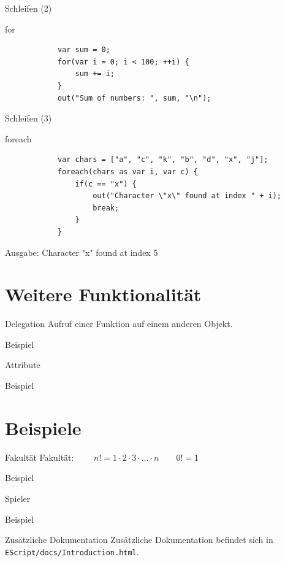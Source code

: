\documentclass[ucs,9pt]{beamer}
\begin{document}
\begin{frame}[fragile]{Schleifen (2)}
	\begin{block}{for}
		\begin{lstlisting}
			var sum = 0;
			for(var i = 0; i < 100; ++i) {
			    sum += i;
			}
			out("Sum of numbers: ", sum, "\n");
		\end{lstlisting}
	\end{block}
\end{frame}

\begin{frame}[fragile]{Schleifen (3)}
	\begin{block}{foreach}
		\begin{lstlisting}
			var chars = ["a", "c", "k", "b", "d", "x", "j"];
			foreach(chars as var i, var c) {
			    if(c == "x") {
			        out("Character \"x\" found at index " + i);
			        break;
			    }
			}
		\end{lstlisting}
	\end{block}
	Ausgabe: Character "x"{} found at index 5
\end{frame}

\section{Weitere Funktionalität}
\begin{frame}{Delegation}
	Aufruf einer Funktion auf einem anderen Objekt.
	\begin{block}{Beispiel}
		
	\end{block}
\end{frame}

\begin{frame}{Attribute}
	\begin{block}{Beispiel}
		
	\end{block}
\end{frame}

\section{Beispiele}
\begin{frame}{Fakultät}
	Fakultät: $\qquad n! = 1 \cdot 2 \cdot 3 \cdot \ldots \cdot n \qquad 0! = 1$
	\begin{block}{Beispiel}
		
	\end{block}
\end{frame}

\begin{frame}{Spieler}
	\begin{block}{Beispiel}
		
	\end{block}
\end{frame}

\begin{frame}{Zusätzliche Dokumentation}
	Zusätzliche Dokumentation befindet sich in \texttt{EScript/docs/Introduction.html}.
\end{frame}

\HNIlastframe
\end{document}
